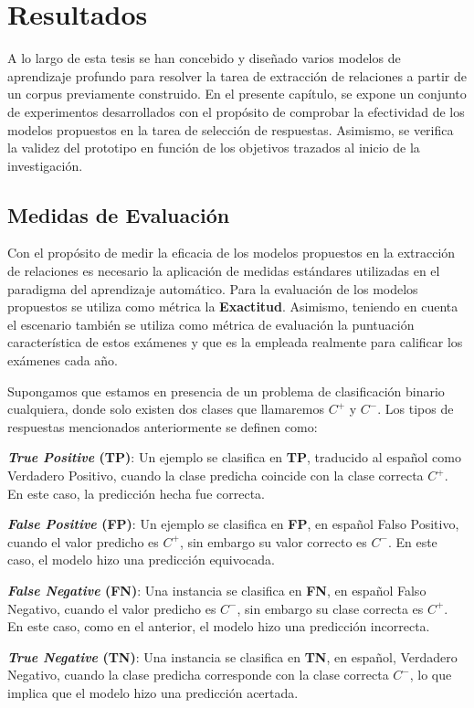 \chapter{Resultados}\label{chapter:results}

A lo largo de esta tesis se han concebido y diseñado varios modelos de aprendizaje profundo para resolver la tarea de extracción de relaciones a partir de un corpus previamente construido. En el presente capítulo, se expone un conjunto de experimentos desarrollados con el propósito de comprobar la efectividad de los modelos propuestos en la tarea de selección de respuestas. Asimismo, se verifica la validez del prototipo en función de los objetivos trazados al inicio de la investigación.

\section{Medidas de Evaluación}

Con el propósito de medir la eficacia de los modelos propuestos en la extracción de relaciones es necesario la aplicación de medidas estándares utilizadas en el paradigma del aprendizaje automático. Para la evaluación de los modelos propuestos se utiliza como métrica la \textbf{Exactitud}. Asimismo, teniendo en cuenta el escenario también se utiliza como métrica de evaluación la puntuación característica de estos exámenes y que es la empleada realmente para calificar los exámenes cada año.

Supongamos que estamos en presencia de un problema de clasificación binario cualquiera, donde solo existen dos clases que llamaremos $C^{+}$ y $C^{-}$. Los tipos de respuestas mencionados anteriormente se definen como:

\begin{description}
  \item \textbf{\textit{True Positive} (TP)}: Un ejemplo se clasifica en \textbf{TP}, traducido al español como Verdadero Positivo, cuando la clase predicha coincide con la clase correcta $C^{+}$. En este caso, la predicción hecha fue correcta.
  \item \textbf{\textit{False Positive} (FP)}: Un ejemplo se clasifica en \textbf{FP}, en español Falso Positivo, cuando el valor predicho es $C^{+}$, sin embargo su valor correcto es $C^{-}$. En este caso, el modelo hizo una predicción equivocada.
  \item \textbf{\textit{False Negative} (FN)}: Una instancia se clasifica en \textbf{FN}, en español Falso Negativo, cuando el valor predicho es $C^{-}$, sin embargo su clase correcta es $C^{+}$. En este caso, como en el anterior, el modelo hizo una predicción incorrecta.
  \item \textbf{\textit{True Negative} (TN)}: Una instancia se clasifica en \textbf{TN}, en español, Verdadero Negativo, cuando la clase predicha corresponde con la clase correcta $C^{-}$, lo que implica que el modelo hizo una predicción acertada.
\end{description}

